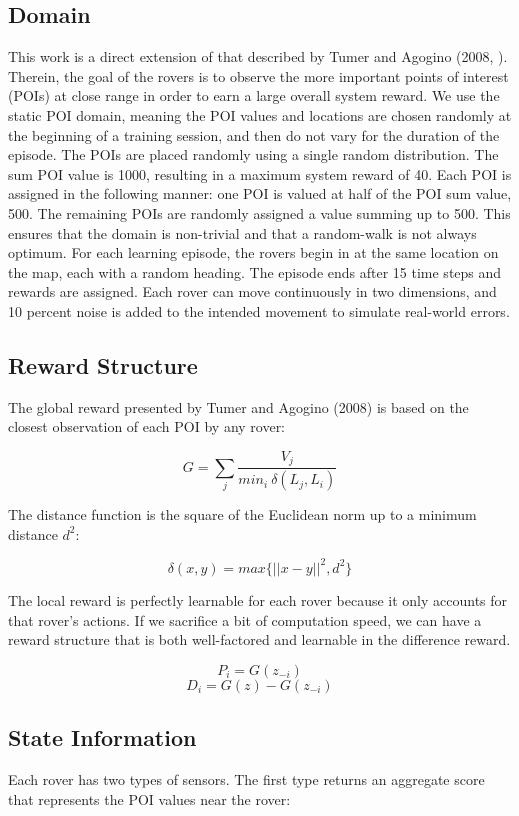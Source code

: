 \documentclass[letterpaper, 10 pt, conference]{ieeeconf}  %
\begin{document}
\subsection{Domain}
This work is a direct extension of that described by Tumer and Agogino
(2008, \cite{agogino2008analyzing}). Therein, the goal of the rovers is to observe the more
important points of interest (POIs) at close range in order to earn a
large overall system reward. We use the static POI domain, meaning the POI values and locations are chosen randomly at the
beginning of a training session, and then do not vary for the duration of the episode. The POIs are placed randomly using a single random distribution. The sum POI value is 1000, resulting in a maximum system reward of 40.  Each POI is assigned in the following manner: one POI is valued at half of the POI sum value, 500.  The remaining POIs are randomly assigned a value summing up to 500.  This ensures that the domain is non-trivial and that a random-walk is not always optimum.  For each learning episode, the rovers begin in at the same location on the map, each with a random heading. The episode
ends after 15 time steps and rewards are assigned. Each rover can move
continuously in two dimensions, and 10 percent noise is added to the
intended movement to simulate real-world errors.

\subsection{Reward Structure}
The global reward presented by Tumer and Agogino (2008) is based on
the closest observation of each POI by any rover:
  
\[
G= \sum_j  \frac{V_j}{min_i \: \delta(L_j, L_i)}
\]

The distance function is the square of the Euclidean norm up to a
minimum distance \(d^2\):

\[
\delta  (x,y) = max \big\{||x - y||^2, d^2 \big\}    
\]

The local reward is perfectly learnable for each rover because it only accounts for that rover's actions. If we sacrifice a bit of computation speed, we can have a reward structure that is both well-factored and learnable in the difference reward.

\[
P_i=G(z_{-i})
\]
\[
D_i=G(z)-G(z_{-i})
\]

\subsection{State Information}
Each rover has two types of sensors. The first type returns an
aggregate score that represents the POI values near the
rover:
\end{document}
